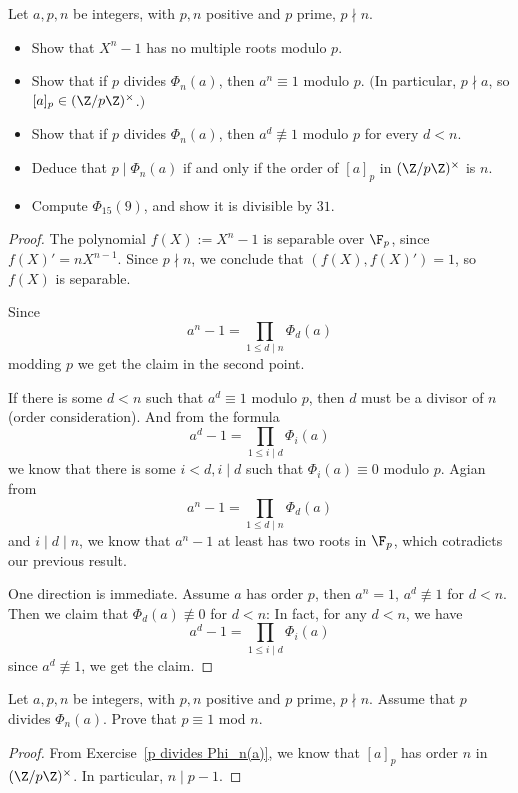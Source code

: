 \begin{exercise}\label{p divides Phi_n(a)}
Let $a,p,n$ be integers, with $p,n$ positive and $p$ prime, $p\nmid n$.
\begin{itemize}
\item Show that $X^n-1$ has no multiple roots modulo $p$.
\item Show that if $p$ divides $\Phi_n(a)$, then $a^n\equiv1$ modulo $p$. $($In particular, $p\nmid a$, so $[a]_p\in(\Z/p\Z)^{\times}$.$)$
\item Show that if $p$ divides $\Phi_n(a)$, then $a^d\not\equiv1$ modulo $p$ for every $d<n$.
\item Deduce that $p\mid\Phi_n(a)$ if and only if the order of $[a]_p$ in $(\Z/p\Z)^{\times}$ is $n$.
\item Compute $\Phi_{15}(9)$, and show it is divisible by $31$.
\end{itemize}
\end{exercise}
\begin{proof}
The polynomial $f(X):=X^n-1$ is separable over $\F_p$, since $f(X)'=nX^{n-1}$. Since $p\nmid n$, we conclude that $(f(X),f(X)')=1$, so $f(X)$ is separable.\par
Since 
\[a^n-1=\prod_{1\leq d\mid n}\Phi_d(a)\]
modding $p$ we get the claim in the second point.\par
If there is some $d<n$ such that $a^d\equiv1$ modulo $p$, then $d$ must be a divisor of $n$ (order consideration). And from the formula
\[a^d-1=\prod_{1\leq i\mid d}\Phi_i(a)\]
we know that there is some $i<d, i\mid d$ such that $\Phi_i(a)\equiv 0$ modulo $p$. Agian from 
\[a^n-1=\prod_{1\leq d\mid n}\Phi_d(a)\]
and $i\mid d\mid n$, we know that $a^n-1$ at least has two roots in $\F_p$, which cotradicts our previous result.\par
One direction is immediate. Assume $a$ has order $p$, then $a^n=1$, $a^d\not\equiv1$ for $d<n$. Then we claim that $\Phi_d(a)\not\equiv 0$ for $d<n$: In fact, for any $d<n$, we have
\[a^d-1=\prod_{1\leq i\mid d}\Phi_i(a)\]
since $a^d\not\equiv 1$, we get the claim.
\end{proof}
\begin{exercise}
Let $a,p,n$ be integers, with $p,n$ positive and $p$ prime, $p\nmid n$. Assume that $p$ divides $\Phi_n(a)$. Prove that $p\equiv1$ mod $n$.
\end{exercise}
\begin{proof}
From Exercise~\ref{p divides Phi_n(a)}, we know that $[a]_p$ has order $n$ in $(\Z/p\Z)^{\times}$. In particular, $n\mid p-1$.
\end{proof}
